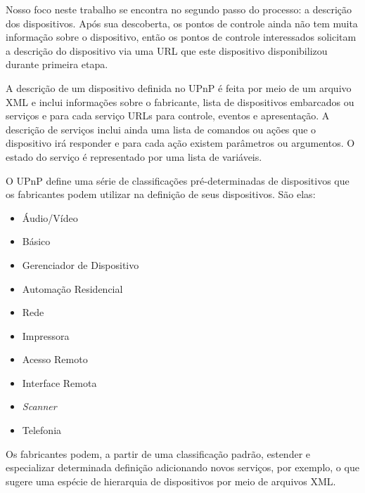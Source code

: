 Nosso foco neste trabalho se encontra no segundo passo do processo: a descrição dos dispositivos. Após sua descoberta, os pontos de controle ainda não tem muita informação sobre o dispositivo, então os pontos de controle interessados solicitam a descrição do dispositivo via uma URL que este dispositivo disponibilizou durante primeira etapa.

A descrição de um dispositivo definida no UPnP é feita por meio de um arquivo XML e inclui informações sobre o fabricante, lista de dispositivos embarcados ou serviços e para cada serviço URLs para controle, eventos e apresentação. A descrição de serviços inclui ainda uma lista de comandos ou ações que o dispositivo irá responder e para cada ação existem parâmetros ou argumentos. O estado do serviço é representado por uma lista de variáveis.

O UPnP define uma série de classificações pré-determinadas de dispositivos que os fabricantes podem utilizar na definição de seus dispositivos. São elas:

\begin{itemize}
\item Áudio/Vídeo
\item Básico
\item Gerenciador de Dispositivo
\item Automação Residencial
\item Rede
\item Impressora
\item Acesso Remoto
\item Interface Remota
\item \emph{Scanner}
\item Telefonia
\end{itemize}

Os fabricantes podem, a partir de uma classificação padrão, estender e especializar determinada definição adicionando novos serviços, por exemplo, o que sugere uma espécie de hierarquia de dispositivos por meio de arquivos XML.



